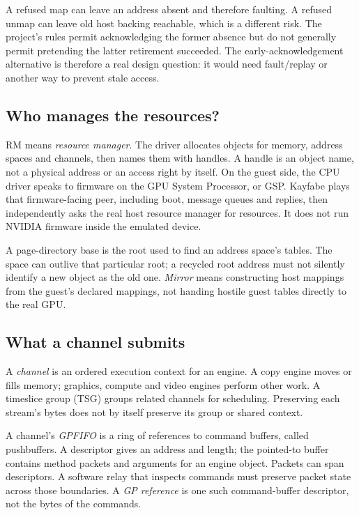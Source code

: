 

\doc A refused map can leave an address absent and therefore faulting. A refused unmap can
leave old host backing reachable, which is a different risk. The project's rules permit
acknowledging the former absence but do not generally permit pretending the latter retirement
succeeded. The early-acknowledgement alternative is therefore a real design question: it would
need fault/replay or another way to prevent stale access.

\subsection{Who manages the resources?}

\doc RM means \emph{resource manager}. The driver allocates objects for memory, address spaces
and channels, then names them with handles. A handle is an object name, not a physical address
or an access right by itself. On the guest side, the CPU driver speaks to firmware on the GPU
System Processor, or GSP. Kayfabe plays that firmware-facing peer, including boot, message
queues and replies, then independently asks the real host resource manager for resources.
It does not run NVIDIA firmware inside the emulated device.

A page-directory base is the root used to find an address space's tables. The space can outlive
that particular root; a recycled root address must not silently identify a new object as the
old one. \emph{Mirror} means constructing host mappings from the guest's declared mappings,
not handing hostile guest tables directly to the real GPU.

\subsection{What a channel submits}

A \emph{channel} is an ordered execution context for an engine. A copy engine moves or fills
memory; graphics, compute and video engines perform other work. A timeslice group (TSG) groups
related channels for scheduling. Preserving each stream's bytes does not by itself preserve
its group or shared context.

A channel's \emph{GPFIFO} is a ring of references to command buffers, called pushbuffers.
A descriptor gives an address and length; the pointed-to buffer contains method packets and
arguments for an engine object. Packets can span descriptors. A software relay that inspects
commands must preserve packet state across those boundaries. A \emph{GP reference} is one
such command-buffer descriptor, not the bytes of the commands.

